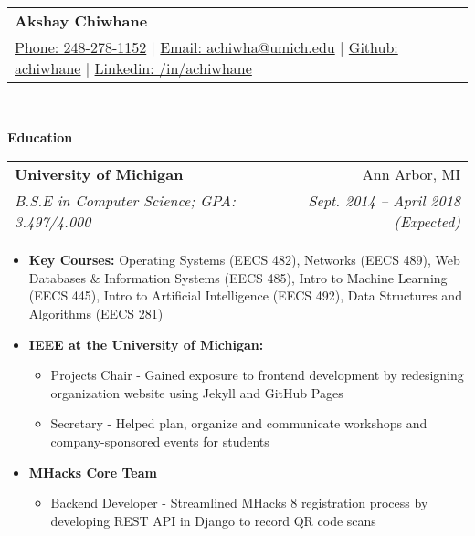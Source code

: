 \documentclass[letterpaper,11pt]{article}
\makeatletter
\newcommand{\resitem}[1]{\item #1 \vspace{-2pt}}
\newcommand{\resheading}[1]{{\large \colorbox{mygrey}{\begin{minipage}{\textwidth}{\textbf{#1 \vphantom{p\^{E}}}}\end{minipage}}}}
\newcommand{\ressubheading}[4]{
\begin{tabular*}{6.875in}{l@{\extracolsep{\fill}}r}
		\textbf{#1} & #2 \\
		\textit{#3} & \textit{#4} \\
\end{tabular*}\vspace{-6pt}}
\renewcommand{\footnotesize}{\fontsize{10pt}{11pt}\selectfont}
\makeatother
\begin{document}
\newcommand{\mywebheader}{
	\begin{tabular*}{7in}{l@{\extracolsep{\fill}}r}
		\textbf{{\LARGE Akshay Chiwhane}} \\
			\href{tel:248-278-1152}{Phone: 248-278-1152} |
			\href{mailto:achiwha@umich.edu}{Email: achiwha@umich.edu} |
			\href{https://github.com/achiwhane}{Github: achiwhane} |
			\href{https://linkedin.com/in/achiwhane}{Linkedin: /in/achiwhane}	\end{tabular*}
		\\
		\vspace{0.1in}}
		
		\mywebheader
		
		\resheading{Education}
		\begin{description}
			\item
			\ressubheading{{University of Michigan}}{Ann Arbor, MI}{B.S.E in Computer Science; GPA: 3.497/4.000}{Sept. 2014 -- April 2018 (Expected)}
			{ \footnotesize
				\begin{itemize}
					\resitem{\textbf{Key Courses:}
						Operating Systems (EECS 482), 
						Networks (EECS 489),
						Web Databases \& Information Systems (EECS 485),
						Intro to Machine Learning (EECS 445),
						Intro to Artificial Intelligence (EECS 492),
						Data Structures and Algorithms (EECS 281)
					}
					\resitem{\textbf{IEEE at the University of Michigan:}} 
					\begin{itemize}
						\resitem{Projects Chair - Gained exposure to frontend development by redesigning organization website using Jekyll and GitHub Pages}
						\resitem{Secretary - Helped plan, organize and communicate workshops and company-sponsored events for students} 
					\end{itemize}
					\resitem{\textbf{MHacks Core Team}} 
					\begin{itemize}
						\resitem{Backend Developer - Streamlined MHacks 8 registration process by developing REST API in Django to record QR code scans}
					\end{itemize}
				\end{itemize}
			}
		\end{description} %
		
\end{document}
